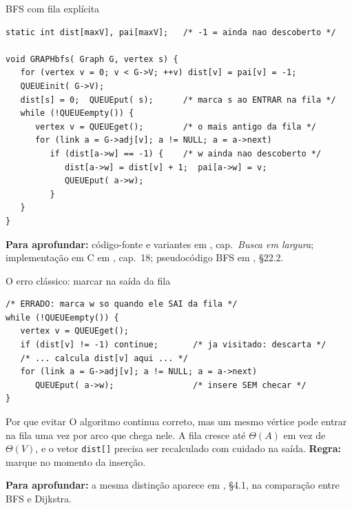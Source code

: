 \documentclass[aspectratio=169]{beamer}
\newcommand{\fonte}[1]{%
  \vfill
  {\tiny\color{gray!55!black}\textbf{Para aprofundar:} #1\par}%
}
\begin{document}
\begin{frame}[fragile]{BFS com fila explícita}
\begin{lstlisting}
static int dist[maxV], pai[maxV];   /* -1 = ainda nao descoberto */

void GRAPHbfs( Graph G, vertex s) {
   for (vertex v = 0; v < G->V; ++v) dist[v] = pai[v] = -1;
   QUEUEinit( G->V);
   dist[s] = 0;  QUEUEput( s);      /* marca s ao ENTRAR na fila */
   while (!QUEUEempty()) {
      vertex v = QUEUEget();        /* o mais antigo da fila */
      for (link a = G->adj[v]; a != NULL; a = a->next)
         if (dist[a->w] == -1) {    /* w ainda nao descoberto */
            dist[a->w] = dist[v] + 1;  pai[a->w] = v;
            QUEUEput( a->w);
         }
   }
}
\end{lstlisting}
  \fonte{código-fonte e variantes em \cite{feofiloff2020algoritmos}, cap.\ \emph{Busca em largura};
  implementação em C em \cite{sedgewick2002algorithms}, cap.~18;
  pseudocódigo \textsc{BFS} em \cite{cormen2009introduction}, §22.2.}
\end{frame}

\begin{frame}[fragile]{O erro clássico: marcar na saída da fila}
\begin{lstlisting}
/* ERRADO: marca w so quando ele SAI da fila */
while (!QUEUEempty()) {
   vertex v = QUEUEget();
   if (dist[v] != -1) continue;       /* ja visitado: descarta */
   /* ... calcula dist[v] aqui ... */
   for (link a = G->adj[v]; a != NULL; a = a->next)
      QUEUEput( a->w);                /* insere SEM checar */
}
\end{lstlisting}
  \begin{block}{Por que evitar}
    {\scriptsize O algoritmo continua correto, mas um mesmo vértice pode entrar
    na fila uma vez por arco que chega nele. A fila cresce até $\Theta(A)$ em
    vez de $\Theta(V)$, e o vetor \texttt{dist[]} precisa ser recalculado com
    cuidado na saída. \textbf{Regra:} marque no momento da inserção.}
  \end{block}
  \fonte{a mesma distinção aparece em \cite{sedgewick2011algorithms}, §4.1, na
  comparação entre BFS e Dijkstra.}
\end{frame}
\end{document}
